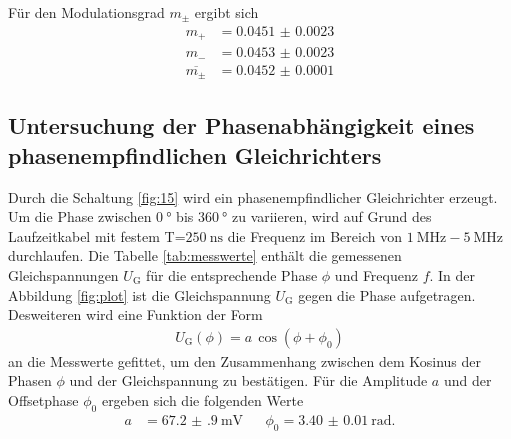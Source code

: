 Für
den Modulationsgrad $m_{\pm}$ ergibt sich
\begin{align*}
  m_+&= \num{0.0451(23)}\\
   m_-&= \num{0.0453(23)} \\
  \overline{m_{\pm}} &= \num{0.0452(1)}
\end{align*}




\FloatBarrier
\subsection{Untersuchung der Phasenabhängigkeit eines
phasenempfindlichen Gleichrichters}
\label{subsec:auswertung_e}
Durch die Schaltung \ref{fig:15} wird ein phasenempfindlicher
Gleichrichter erzeugt. Um die Phase \phi zwischen
$\SI{0}{\degree}$ bis $\SI{360}{\degree}$ zu variieren, wird
auf Grund des Laufzeitkabel mit festem T=$\SI{250}{\nano\second}$
die Frequenz im Bereich von $\SI{1}{\mega\hertz}-\SI{5}{\mega\hertz}$
durchlaufen. Die Tabelle \ref{tab:messwerte} enthält die gemessenen
Gleichspannungen $U_{\text{G}}$ für die entsprechende Phase $\phi$ und Frequenz $f$.
In der Abbildung \ref{fig:plot} ist die Gleichspannung $U_{\text{G}}$
gegen die Phase aufgetragen.
Desweiteren wird eine Funktion der Form
\begin{align}
  U_{\text{G}}(\phi)=a \, \cos(\phi+\phi_0)
\end{align}
an die Messwerte gefittet,
um den Zusammenhang zwischen dem Kosinus der
Phasen $\phi$ und der Gleichspannung zu bestätigen.
Für die Amplitude $a$ und der Offsetphase $\phi_0$
ergeben sich die folgenden Werte
\begin{align}
a&=\SI{67.2(9)}{\milli\volt}& &\phi_0=\SI{3.40(1)}{\radian}.
\end{align}
%
